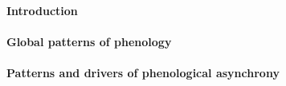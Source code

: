 \documentclass[12pt]{article}
\begin{document}

\paragraph*{Introduction}


\paragraph*{Global patterns of phenology}



\paragraph*{Patterns and drivers of phenological asynchrony}







\end{document}
